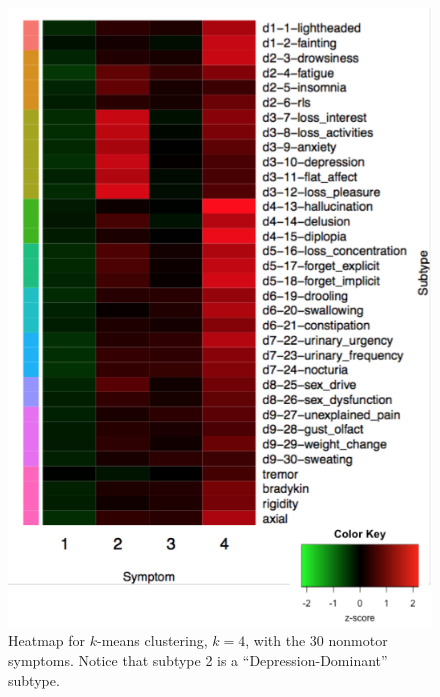 \documentclass[10pt]{article}
\begin{document}
\begin{multicols}{2}
\begin{figure}[p]
  \centering
  \includegraphics[width=0.6\linewidth]{nms30m-k4-heatmap-improved.png}
  \caption{Heatmap for $k$-means clustering, $k = 4$, with the 30 nonmotor symptoms. Notice that
  subtype 2 is a ``Depression-Dominant'' subtype.} \label{fig:nms30m-k4-heatmap-improved}
\end{figure}


\end{multicols}
\end{document}
